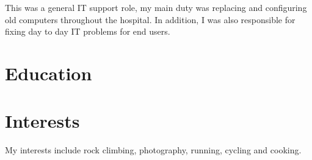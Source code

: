 \documentclass[11pt,a4paper,sans]{moderncv}
\begin{document}
{This was a general IT support role, my main duty was replacing and configuring old computers throughout the hospital. In addition, I was also responsible for fixing day to day IT problems for end users.}

\section{Education}

\section{Interests}
My interests include rock climbing, photography, running, cycling and cooking.
\end{document}
